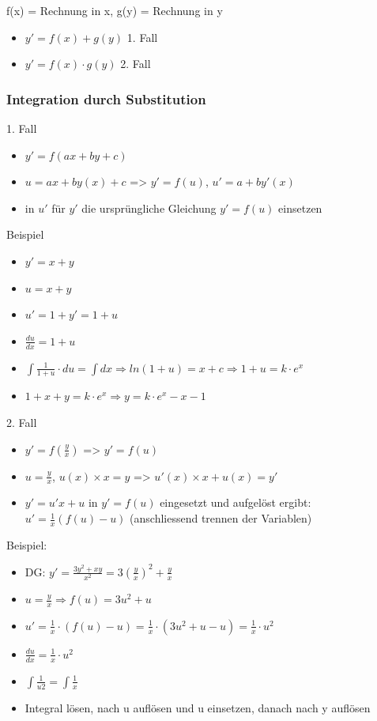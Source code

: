 f(x) = Rechnung in x, g(y) = Rechnung in y
\begin{itemize}
\item $y'=f(x)+g(y)$ 1. Fall
\item $y'=f(x)\cdot g(y)$ 2. Fall
\end{itemize}

\subsubsection*{Integration durch Substitution}

1. Fall
\begin{itemize}
\item $y'=f(ax+by+c)$
\item $u=ax+by(x)+c$ => $y'=f(u)$, $u'=a+by'(x)$
\item in $u'$ für $y'$ die ursprüngliche Gleichung $y'=f(u)$ einsetzen
\end{itemize}
Beispiel
\begin{itemize}
\item $y'=x+y$
\item $u=x+y$
\item $u'=1+y'=1+u$
\item $\frac{du}{dx}=1+u$
\item $\int\frac{1}{1+u}\cdot du=\int dx\Rightarrow ln(1+u)=x+c\Rightarrow1+u=k\cdot e^{x}$
\item $1+x+y=k\cdot e^{x}\Rightarrow y=k\cdot e^{x}-x-1$
\end{itemize}
2. Fall
\begin{itemize}
\item $y'=f(\frac{y}{x})$ => $y'=f(u)$
\item $u=\frac{y}{x}$, $u(x)\times x=y$ => $u'(x)\times x+u(x)=y'$
\item $y'=u'x+u$ in $y'=f(u)$ eingesetzt und aufgelöst ergibt: $u'=\frac{1}{x}(f(u)-u)$
(anschliessend trennen der Variablen)
\end{itemize}
Beispiel:
\begin{itemize}
\item DG: $y'=\frac{3y^{2}+xy}{x^{2}}=3(\frac{y}{x})^{2}+\frac{y}{x}$
\item $u=\frac{y}{x}\Rightarrow f(u)=3u^{2}+u$
\item $u'=\frac{1}{x}\cdot(f(u)-u)=\frac{1}{x}\cdot(3u^{2}+u-u)=\frac{1}{x}\cdot u^{2}$
\item $\frac{du}{dx}=\frac{1}{x}\cdot u^{2}$
\item $\int\frac{1}{u2}=\int\frac{1}{x}$
\item Integral lösen, nach u auflösen und u einsetzen, danach nach y auflösen
\end{itemize}

